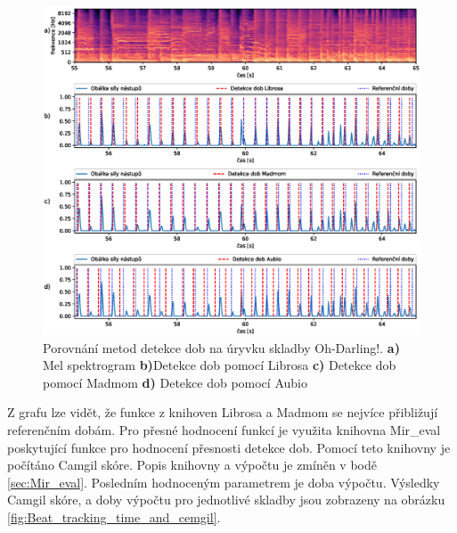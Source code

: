 \begin{figure}[H]
    \centering
    \includegraphics[width = 1\linewidth]{obrazky/Oh-Darling_Beat_analysis_graphs.eps}
    \caption{Porovnání metod detekce dob na úryvku skladby Oh-Darling!. \textbf{a)} Mel spektrogram \textbf{b)}Detekce dob pomocí Librosa \textbf{c)} Detekce dob pomocí Madmom \textbf{d)} Detekce dob pomocí Aubio}
    \label{fig:Oh-Darling_beat_analysis}
\end{figure}

Z grafu lze vidět, že funkce z knihoven Librosa a Madmom se nejvíce přibližují referenčním dobám. Pro přesné hodnocení funkcí je využita knihovna Mir\_eval poskytující funkce pro hodnocení přesnosti detekce dob. Pomocí teto knihovny je počítáno Camgil skóre. Popis knihovny a výpočtu je zmíněn v bodě \ref{sec:Mir_eval}. Posledním hodnoceným parametrem je doba výpočtu. Výsledky Camgil skóre, a doby výpočtu pro jednotlivé skladby jsou zobrazeny na obrázku \ref{fig:Beat_tracking_time_and_cemgil}.

